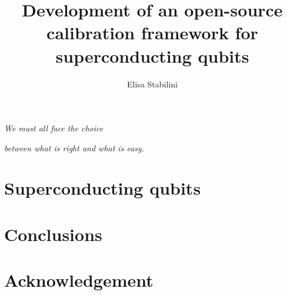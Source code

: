 \documentclass[twoside]{book}
\title{Development of an open-source calibration framework for superconducting qubits}
\author{Elisa Stabilini}
\date{}
\renewcommand{\chaptermark}[1]{\markboth{\chaptername\ \thechapter.\ #1}{}} %
\begin{document}
\frontmatter


\clearpage
\begin{center}
    \thispagestyle{empty}
    \vspace*{\fill}
    \begin{flushright}
    \textit{We must all face the choice}
    \end{flushright}
    \begin{flushright}
    \textit{between what is right and what is easy.}
    \end{flushright}
    \vspace*{\fill}
\end{center}
\clearpage  

\clearpage
\tableofcontents
\clearpage


\mainmatter
%
\chapter{Superconducting qubits}







\chapter{Conclusions}
%

\backmatter
\printbibliography

\appendix
\cleardoublepage
\renewcommand{\chaptermark}[1]{\markboth{##1}{}}



\chapter*{Acknowledgement}

\end{document}
